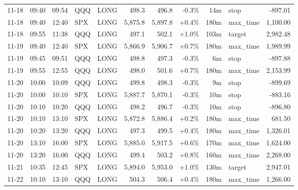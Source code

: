 \documentclass[11pt,a4paper,twoside]{article}
\begin{document}
\begin{center}
\begin{longtable}{>{\color{txtmain}}l l l l l r r r r >{\color{txtmain}}l r}
11-18 & 09:40 & 09:54 & QQQ & LONG & 498.3 & 496.8 & \textcolor{lossred}{-0.3\%} & 14m & stop & \textcolor{lossred}{-897.01} \\
11-18 & 09:40 & 12:40 & SPX & LONG & 5,875.8 & 5,897.8 & \textcolor{wingreen}{+0.4\%} & 180m & max\_time & \textcolor{wingreen}{1,100.00} \\
11-18 & 09:55 & 11:38 & QQQ & LONG & 497.1 & 502.1 & \textcolor{wingreen}{+1.0\%} & 103m & target & \textcolor{wingreen}{2,982.48} \\
11-19 & 09:40 & 12:40 & SPX & LONG & 5,866.9 & 5,906.7 & \textcolor{wingreen}{+0.7\%} & 180m & max\_time & \textcolor{wingreen}{1,989.99} \\
11-19 & 09:45 & 09:51 & QQQ & LONG & 498.8 & 497.3 & \textcolor{lossred}{-0.3\%} & 6m & stop & \textcolor{lossred}{-897.88} \\
11-19 & 09:55 & 12:55 & QQQ & LONG & 498.0 & 501.6 & \textcolor{wingreen}{+0.7\%} & 180m & max\_time & \textcolor{wingreen}{2,153.99} \\
11-20 & 10:00 & 10:09 & QQQ & LONG & 499.8 & 498.3 & \textcolor{lossred}{-0.3\%} & 9m & stop & \textcolor{lossred}{-899.69} \\
11-20 & 10:00 & 10:10 & SPX & LONG & 5,887.7 & 5,870.1 & \textcolor{lossred}{-0.3\%} & 10m & stop & \textcolor{lossred}{-883.16} \\
11-20 & 10:10 & 10:20 & QQQ & LONG & 498.2 & 496.7 & \textcolor{lossred}{-0.3\%} & 10m & stop & \textcolor{lossred}{-896.80} \\
11-20 & 10:10 & 13:10 & SPX & LONG & 5,872.8 & 5,886.4 & \textcolor{wingreen}{+0.2\%} & 180m & max\_time & \textcolor{wingreen}{681.50} \\
11-20 & 10:20 & 13:20 & QQQ & LONG & 497.3 & 499.5 & \textcolor{wingreen}{+0.4\%} & 180m & max\_time & \textcolor{wingreen}{1,326.01} \\
11-20 & 13:10 & 16:00 & SPX & LONG & 5,885.0 & 5,917.5 & \textcolor{wingreen}{+0.6\%} & 170m & max\_time & \textcolor{wingreen}{1,624.00} \\
11-20 & 13:20 & 16:00 & QQQ & LONG & 499.4 & 503.2 & \textcolor{wingreen}{+0.8\%} & 160m & max\_time & \textcolor{wingreen}{2,268.00} \\
11-21 & 10:35 & 12:45 & SPX & LONG & 5,894.0 & 5,953.0 & \textcolor{wingreen}{+1.0\%} & 130m & target & \textcolor{wingreen}{2,947.01} \\
11-22 & 10:10 & 13:10 & QQQ & LONG & 504.3 & 506.4 & \textcolor{wingreen}{+0.4\%} & 180m & max\_time & \textcolor{wingreen}{1,266.00} \\

\end{longtable}
\end{center}
\end{document}
